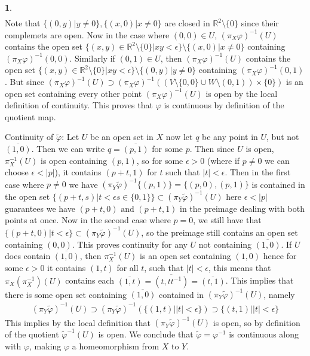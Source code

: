 \documentclass[10.5pt]{article}
\theoremstyle{definition}
\newtheorem{pb}{}
\newcommand{\set}[1]{\{#1\}}
\newcommand{\abs}[1]{\lvert#1\rvert}
\newcommand{\tand}{\text{ and }}
\begin{document}
\begin{pb}
\begin{align*}
        \end{align*}
       Note that \(\set{(0,y) \vert y \neq 0}, \set{(x,0) \vert x \neq 0}\) are closed in \(\mathbb{R}^2 \setminus \set{0}\) since their complemets are open.
        Now in the case where \((0,0) \in U\), \((\pi_X \varphi)^{-1}(U)\) contains the open set \(\set{(x,y) \in \mathbb{R}^2\setminus \set{0}\vert xy < \epsilon} \setminus \set{(x,0) \vert x \neq 0}\)
        containing \((\pi_X \varphi)^{-1}(0,0)\). Similarly if \((0,1) \in U\), then 
        \((\pi_X \varphi)^{-1}(U)\) contains the open set \(\set{(x,y) \in \mathbb{R}^2\setminus \set{0}\vert xy < \epsilon} \setminus \set{(0,y) \vert y \neq 0}\)
        containing \((\pi_X \varphi)^{-1}(0,1)\). But since \((\pi_X \varphi)^{-1}(U) \supset (\pi_X \varphi)^{-1}((V \setminus \set{0,0} \cup W \setminus (0,1)) \times \set{0})\) is an open set containing
        every other point \((\pi_X \varphi)^{-1}(U)\) is open by the local definition of continuity. This proves that \(\varphi\) is continuous by definition of the quotient map.

        Continuity of \(\tilde{\varphi}\): Let \(U\) be an open set in \(X\) now let \(q\) be any point in \(U\), but not \(\overline{(1,0)}\). Then we can write \(q = \overline{(p,1)}\) for some \(p\).
        Then since \(U\) is open, \(\pi_X^{-1}(U)\) is open containing \((p,1)\), so for some \(\epsilon > 0\) (where if \(p \neq 0\)
        we can choose \(\epsilon < \abs{p}\)), it contains \((p + t,1)\) for \(t\) such that \(\abs{t} < \epsilon\).
        Then in the first case where \(p \neq 0\) we have
        \((\pi_Y\tilde{\varphi})^{-1}\set{(p,1)} = \set{(p,0), (p,1)}\) is contained in the open set \(\set{(p + t,s) \vert t < \epsilon s \in \set{0,1}} \subset (\pi_Y\tilde{\varphi})^{-1}(U)\) 
        here \(\epsilon < \abs{p}\) guarantees we have \((p+t,0) \tand (p+t,1)\) in the preimage dealing with both points at once. Now in the second case where \(p = 0\), we still have that 
        \(\set{(p + t,0) \vert t < \epsilon} \subset (\pi_Y\tilde{\varphi})^{-1}(U)\), so the preimage still contains an open set containing \((0,0)\). This proves continuity for any \(U\)
        not containing \(\overline{(1,0)}\). If \(U\) does contain \(\overline{(1,0)}\), then \(\pi_X^{-1}(U)\) is an open set containing \((1,0)\) hence for some \(\epsilon > 0\) it contains 
        \((1,t)\) for all \(t\), such that \(\abs{t} < \epsilon\), this means that \(\pi_X(\pi_X^{-1})(U)\) contains each \(\overline{(1,t)} = \overline{(t,tt^{-1})} = \overline{(t,1)}\).
        This implies that there is some open set containing \(\overline{(1,0)}\) contained in \((\pi_Y\tilde{\varphi})^{-1}(U)\),
        namely \begin{align*}
            (\pi_Y\tilde{\varphi})^{-1}(U) \supset (\pi_Y\tilde{\varphi})^{-1}(\set{(1,t) \vert \abs{t} < \epsilon}) \supset \set{(t,1) \vert \abs{t} < \epsilon}
        \end{align*}
        This implies by the local definition that \((\pi_Y\tilde{\varphi})^{-1}(U)\) is open, so by definition of the quotient \(\tilde{\varphi}^{-1}(U)\) is open. We conclude that
        \(\tilde{\varphi} = \varphi^{-1}\) is continuous along with \(\varphi\), making \(\varphi\) a homeomorphism from \(X\) to \(Y\).
    \end{pb}
\end{document}

